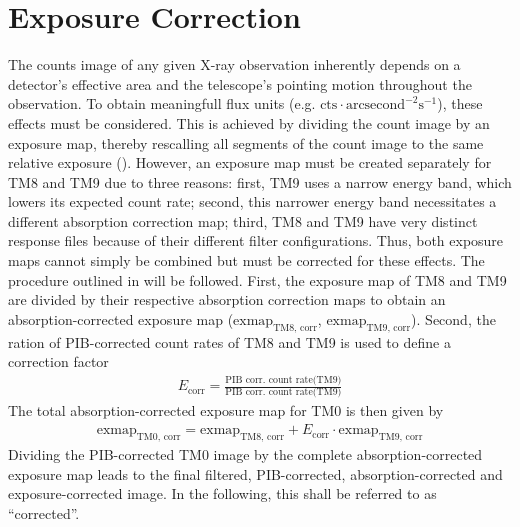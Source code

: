 \section{Exposure Correction}
The counts image of any given X-ray observation inherently depends on a detector's effective area and the telescope's pointing motion throughout the observation. To obtain meaningfull flux units (e.g. \(\text{cts}\cdot\text{arcsecond}^{-2}\text{s}^{-1}\)), these effects must be considered. This is achieved by dividing the count image by an exposure map, thereby rescalling all segments of the count image to the same relative exposure (\cite{davis2001formal}). However, an exposure map must be created separately for TM8 and TM9 due to three reasons: first, TM9 uses a narrow energy band, which lowers its expected count rate; second, this narrower energy band necessitates a different absorption correction map; third, TM8 and TM9 have very distinct response files because of their different filter configurations. Thus, both exposure maps cannot simply be combined but must be corrected for these effects. The procedure outlined in \cite{Reiprich2021} will be followed. First, the exposure map of TM8 and TM9 are divided by their respective absorption correction maps to obtain an absorption-corrected exposure map (\(\text{exmap}_\text{TM8, corr}\), \(\text{exmap}_\text{TM9, corr}\)). Second, the ration of PIB-corrected count rates of TM8 and TM9 is used to define a correction factor 
\begin{align*}
    E_\text{corr} = \frac{\text{PIB corr. count rate(TM9)}}{\text{PIB corr. count rate(TM9)}}
\end{align*}
The total absorption-corrected exposure map for TM0 is then given by
\begin{align*}
    \text{exmap}_\text{TM0, corr} = \text{exmap}_\text{TM8, corr} + E_\text{corr}\cdot\text{exmap}_\text{TM9, corr} 
\end{align*}
Dividing the PIB-corrected TM0 image by the complete absorption-corrected exposure map leads to the final filtered, PIB-corrected, absorption-corrected and exposure-corrected image. In the following, this shall be referred to as \enquote{corrected}.
